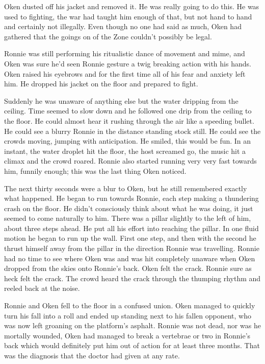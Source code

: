 Oken dusted off his jacket and removed it. He was really going to do this. He was used to fighting, the war had taught him enough of that, but not hand to hand and certainly not illegally. Even though no one had said as much, Oken had gathered that the goings on of the Zone couldn't possibly be legal.

Ronnie was still performing his ritualistic dance of movement and mime, and Oken was sure he'd seen Ronnie gesture a twig breaking action with his hands. Oken raised his eyebrows and for the first time all of his fear and anxiety left him. He dropped his jacket on the floor and prepared to fight. 

Suddenly he was unaware of anything else but the water dripping from the ceiling. Time seemed to slow down and he followed one drip from the ceiling to the floor. He could almost hear it rushing through the air like a speeding bullet. He could see a blurry Ronnie in the distance standing stock still. He could see the crowds moving, jumping with anticipation. He smiled, this would be fun. In an instant, the water droplet hit the floor, the host screamed go, the music hit a climax and the crowd roared. Ronnie also started running very very fast towards him, funnily enough; this was the last thing Oken noticed.  

The next thirty seconds were a blur to Oken, but he still remembered exactly what happened. He began to run towards Ronnie, each step making a thundering crash on the floor. He didn't consciously think about what he was doing, it just seemed to come naturally to him. There was a pillar slightly to the left of him, about three steps ahead. He put all his effort into reaching the pillar. In one fluid motion he began to run up the wall. First one step, and then with the second he thrust himself away from the pillar in the direction Ronnie was travelling. Ronnie had no time to see where Oken was and was hit completely unaware when Oken dropped from the skies onto Ronnie's back. Oken felt the crack. Ronnie sure as heck felt the crack. The crowd heard the crack through the thumping rhythm and reeled back at the noise. 

Ronnie and Oken fell to the floor in a confused union. Oken managed to quickly turn his fall into a roll and ended up standing next to his fallen opponent, who was now left groaning on the platform's asphalt. Ronnie was not dead, nor was he mortally wounded, Oken had managed to break a vertebrae or two in Ronnie's back which would definitely put him out of action for at least three months. That was the diagnosis that the doctor had given at any rate.



